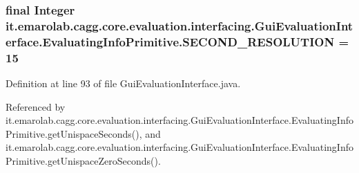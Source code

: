 \hypertarget{classit_1_1emarolab_1_1cagg_1_1core_1_1evaluation_1_1interfacing_1_1GuiEvaluationInterface_1_1EvaluatingInfoPrimitive_a634c8a5b9c7a3e91fa2a37f20071bcee}{
\subsubsection[{S\-E\-C\-O\-N\-D\-\_\-\-R\-E\-S\-O\-L\-U\-T\-I\-O\-N}]{\setlength{\rightskip}{0pt plus 5cm}final Integer it.\-emarolab.\-cagg.\-core.\-evaluation.\-interfacing.\-Gui\-Evaluation\-Interface.\-Evaluating\-Info\-Primitive.\-S\-E\-C\-O\-N\-D\-\_\-\-R\-E\-S\-O\-L\-U\-T\-I\-O\-N = 15\hspace{0.3cm}{\ttfamily [static]}}}\label{classit_1_1emarolab_1_1cagg_1_1core_1_1evaluation_1_1interfacing_1_1GuiEvaluationInterface_1_1EvaluatingInfoPrimitive_a634c8a5b9c7a3e91fa2a37f20071bcee}


Definition at line 93 of file Gui\-Evaluation\-Interface.\-java.



Referenced by it.\-emarolab.\-cagg.\-core.\-evaluation.\-interfacing.\-Gui\-Evaluation\-Interface.\-Evaluating\-Info\-Primitive.\-get\-Unispace\-Seconds(), and it.\-emarolab.\-cagg.\-core.\-evaluation.\-interfacing.\-Gui\-Evaluation\-Interface.\-Evaluating\-Info\-Primitive.\-get\-Unispace\-Zero\-Seconds().

